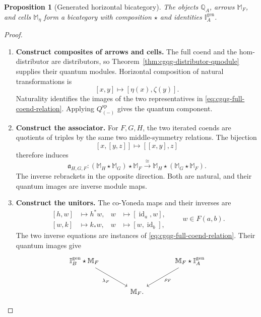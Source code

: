 \documentclass[oneside]{article}
\newcommand{\id}{\operatorname{id}}
\theoremstyle{plain}
\newtheorem{proposition}[theorem]{Proposition}
\theoremstyle{definition}
\theoremstyle{remark}
\begin{document}
\begin{proposition}[Generated horizontal bicategory]
\label{prop:cgqg-generated-qmodule-bicategory}
The objects \(\mathbb Q_A\), arrows \(\mathbb M_F\), and cells
\(\mathbb M_\eta\) form a bicategory with composition \(\star\) and
identities \(\mathbb I_A^{\mathrm{gen}}\).
\end{proposition}
\begin{proof}
    \leavevmode
    \begin{enumerate}[beginpenalty=10000]
        \item \textbf{Construct composites of arrows and cells.}
        The full coend and the hom-distributor are distributors, so
        Theorem~\ref{thm:cgqg-distributor-qmodule} supplies their quantum
        modules. Horizontal composition of natural transformations is
        \[
        [x,y]\longmapsto[\eta(x),\zeta(y)].
        \]
        Naturality identifies the images of the two representatives in
        \eqref{eq:cgqg-full-coend-relation}. Applying
        \(Q_{(-)}^{\mathrm{sp}}\) gives the quantum component.

        \item \textbf{Construct the associator.}
        For \(F,G,H\), the two iterated coends are quotients of triples
        by the same two middle-symmetry relations. The bijection
        \[
        [x,[y,z]]\longmapsto[[x,y],z]
        \]
        therefore induces
        \[
        \mathfrak a_{H,G,F}:
        (\mathbb M_H\star\mathbb M_G)\star\mathbb M_F
        \xrightarrow{\cong}
        \mathbb M_H\star(\mathbb M_G\star\mathbb M_F).
        \]
        The inverse rebrackets in the opposite direction. Both are
        natural, and their quantum images are inverse module maps.

        \item \textbf{Construct the unitors.}
        The co-Yoneda maps and their inverses are
        \[
        \begin{aligned}
        [h,w]&\longmapsto h^*w,
        &w&\longmapsto[\id_a,w],\\
        [w,k]&\longmapsto k_*w,
        &w&\longmapsto[w,\id_b],
        \end{aligned}
        \qquad w\in F(a,b).
        \]
        The two inverse equations are instances of
        \eqref{eq:cgqg-full-coend-relation}. Their quantum images give
        \[
        \begin{tikzcd}[column sep=large,row sep=large]
        \mathbb I_B^{\mathrm{gen}}\star\mathbb M_F
          \arrow[dr,"\lambda_F"']
          &&\mathbb M_F\star\mathbb I_A^{\mathrm{gen}}
              \arrow[dl,"\rho_F"]\\
          &\mathbb M_F.&
        \end{tikzcd}
        \]


\end{enumerate}
\end{proof}
\end{document}
